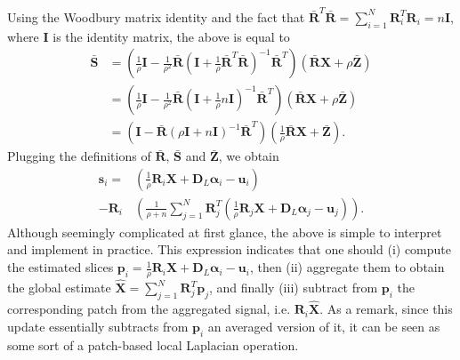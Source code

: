 \documentclass[10pt,twocolumn,letterpaper]{article}
\def\Xb{{\mathbf{\bar{S}}}}
\def\Rb{{\mathbf{\bar{R}}}}
\def\Zb{{\mathbf{\bar{Z}}}}
\def\p{{\mathbf p}}
\def\s{{\mathbf s}}
\def\X{{\mathbf X}}
\def\u{ \mathbf{u}}
\def\u{{\mathbf u}}
\def\D{{\mathbf D}}
\def\R{{\mathbf R}}
\def\alfa{{\boldsymbol \alpha}}
\begin{document}
Using the Woodbury matrix identity and the fact that $\Rb^T \Rb = \sum_{i=1}^N \R_i^T \R_i = n \mathbf{I}$, where $\mathbf{I}$ is the identity matrix, the above is equal to
\begin{align}
	\Xb & = \left( \frac{1}{\rho} \mathbf{I} - \frac{1}{\rho^2} \Rb \left( \mathbf{I} + \frac{1}{\rho} \Rb^T \Rb \right)^{-1} \Rb^T \right) \left( \Rb \X + \rho \Zb \right) \\
	& = \left( \frac{1}{\rho} \mathbf{I} - \frac{1}{\rho^2} \Rb \left( \mathbf{I} + \frac{1}{\rho} n \mathbf{I} \right)^{-1} \Rb^T \right) \left( \Rb \X + \rho \Zb \right) \\
	& = \left( \mathbf{I} - \Rb \left( \rho \mathbf{I} + n \mathbf{I} \right)^{-1} \Rb^T \right) \left( \frac{1}{\rho} \Rb \X + \Zb \right).
\end{align}		
Plugging the definitions of $\Rb$, $\Xb$ and $\Zb$, we obtain
\begin{align} \label{Eq:single_layer_local_laplacian}
	\s_i = & \left( \frac{1}{\rho} \R_i \X + \D_L \alfa_i - \u_i \right) \\
	- \R_i & \left( \frac{1}{\rho + n} \sum_{j=1}^N \R_j^T \left( \frac{1}{\rho} \R_j \X + \D_L \alfa_j - \u_j \right) \right).
\end{align}
Although seemingly complicated at first glance, the above is simple to interpret and implement in practice. This expression indicates that one should (i) compute the estimated slices $\p_i = \frac{1}{\rho} \R_i \X + \D_L \alfa_i - \u_i$, then (ii) aggregate them to obtain the global estimate $\hat{\X} = \sum_{j=1}^N \R_j^T \p_j$, and finally (iii) subtract from $\p_i$ the corresponding patch from the aggregated signal, i.e. $\R_i \hat{\X}$. As a remark, since this update essentially subtracts from $\p_i$ an averaged version of it, it can be seen as some sort of a patch-based local Laplacian operation.
\end{document}
